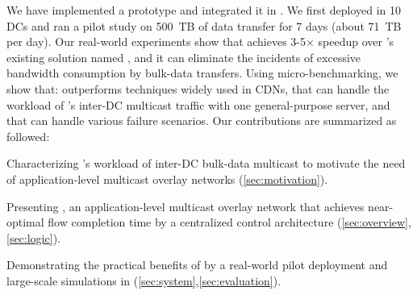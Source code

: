 We have implemented a prototype and integrated it in
\company. We first deployed
\name {} in 10 DCs and ran a pilot study on 500~TB of data transfer
for 7 days (about 71~TB per day).
Our real-world experiments show that \name achieves 3-5$\times$
speedup over \company's existing solution named \alg, and it can eliminate the
incidents of excessive bandwidth consumption by bulk-data transfers.
Using micro-benchmarking, we show
that: \name outperforms techniques widely used in CDNs, that \name
can handle the workload of \company's inter-DC multicast traffic with
one general-purpose server, and that \name can handle various
failure scenarios.
Our contributions are summarized as followed:
\begin{packeditemize}
\item Characterizing \company's workload of inter-DC bulk-data
multicast to motivate the need of application-level multicast
overlay networks (\Section\ref{sec:motivation}).
\item Presenting \name, an application-level multicast overlay
network that achieves near-optimal flow completion time by a
centralized control architecture
(\Section\ref{sec:overview},\ref{sec:logic}).
\item Demonstrating the practical benefits of \NEW{\name} by a real-world
pilot deployment and large-scale simulations in \company (\Section\ref{sec:system},\ref{sec:evaluation}).
\end{packeditemize}
